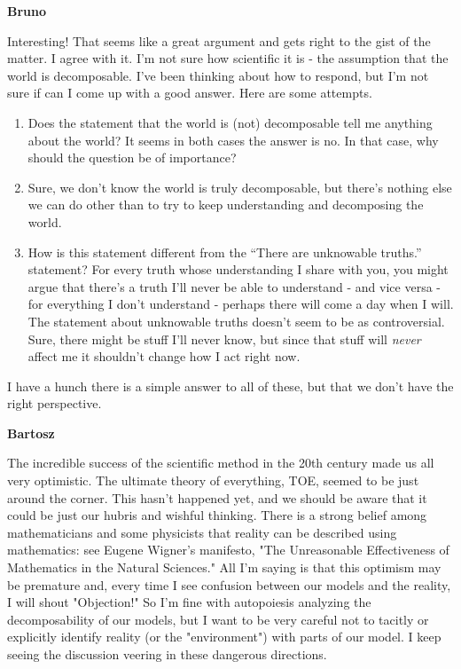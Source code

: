 \documentclass{amsart}
\newcommand{\respond}[1]{
  \vspace{1em} \textbf{#1}
}
\begin{document}
\respond{Bruno}

Interesting! That seems like a great argument and gets right to the gist of the matter.
I agree with it. I'm not sure how scientific it is - the assumption that the world
is decomposable.
I've been thinking about how to respond, but I'm not sure if can I come up
with a good answer. Here are some attempts.

\begin{enumerate}
\item Does the statement that the world is (not) decomposable tell me anything
  about the world? It seems in both cases the answer is no. In that case, why
  should the question be of importance?
\item Sure, we don't know the world is truly decomposable, but
there's nothing else we can do other than to try to keep understanding and
decomposing the world.
\item How is this statement different from the ``There are unknowable truths.'' statement?
  For every truth whose understanding I share with you, you might argue that there's a truth I'll never be able to understand - and vice versa - for everything I don't
  understand - perhaps there will come a day when I will. The statement about
  unknowable truths doesn't seem to be as controversial. Sure, there might be
  stuff I'll never know, but since that stuff will \textit{never} affect me it shouldn't
  change how I act right now.
\end{enumerate}

I have a hunch there is a simple answer to all of these, but that we don't have the right perspective.

\respond{Bartosz}

The incredible success of the scientific method in the 20th century made us all very optimistic. The ultimate theory of everything, TOE, seemed to be just around the corner. This hasn't happened yet, and we should be aware that it could be just our hubris and wishful thinking. There is a strong belief among mathematicians and some physicists that reality can be described using mathematics: see Eugene Wigner's manifesto,  "The Unreasonable Effectiveness of Mathematics in the Natural Sciences." All I'm saying is that this optimism may be premature and, every time I see confusion between our models and the reality, I will shout "Objection!" So I'm fine with autopoiesis analyzing the decomposability of our models, but I want to be very careful not to tacitly or explicitly identify reality (or the "environment") with parts of our model. I keep seeing the discussion veering in these dangerous directions.
\end{document}
